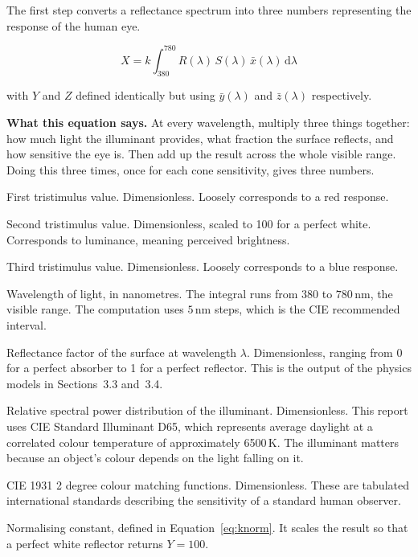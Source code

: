 \documentclass[11pt,a4paper]{article}
\newcommand{\nm}{\ensuremath{\,\mathrm{nm}}}
\newenvironment{symlist}
  {\vspace{-0.2em}\begin{list}{}{%
    \setlength{\leftmargin}{2.4em}\setlength{\labelwidth}{2.0em}%
    \setlength{\labelsep}{0.4em}\setlength{\itemsep}{1pt}%
    \setlength{\parsep}{0pt}\setlength{\topsep}{3pt}%
    \renewcommand{\makelabel}[1]{##1\hfil}}}
  {\end{list}}
\begin{document}
The first step converts a reflectance spectrum into three numbers representing
the response of the human eye.

\begin{equation}
X = k\!\int_{380}^{780} R(\lambda)\,S(\lambda)\,\bar{x}(\lambda)\,\mathrm{d}\lambda
\label{eq:tristim}
\end{equation}

with $Y$ and $Z$ defined identically but using $\bar{y}(\lambda)$ and
$\bar{z}(\lambda)$ respectively.

\noindent\textbf{What this equation says.} At every wavelength, multiply three
things together: how much light the illuminant provides, what fraction the
surface reflects, and how sensitive the eye is. Then add up the result across
the whole visible range. Doing this three times, once for each cone
sensitivity, gives three numbers.

\begin{symlist}
\item[$X$] First tristimulus value. Dimensionless. Loosely corresponds to a red
response.
\item[$Y$] Second tristimulus value. Dimensionless, scaled to 100 for a perfect
white. Corresponds to luminance, meaning perceived brightness.
\item[$Z$] Third tristimulus value. Dimensionless. Loosely corresponds to a
blue response.
\item[$\lambda$] Wavelength of light, in nanometres. The integral runs from 380
to $780\nm$, the visible range. The computation uses $5\nm$ steps, which is the
CIE recommended interval.
\item[$R(\lambda)$] Reflectance factor of the surface at wavelength $\lambda$.
Dimensionless, ranging from 0 for a perfect absorber to 1 for a perfect
reflector. This is the output of the physics models in
Sections~3.3 and~3.4.
\item[$S(\lambda)$] Relative spectral power distribution of the illuminant.
Dimensionless. This report uses CIE Standard Illuminant D65, which represents
average daylight at a correlated colour temperature of approximately 6500\,K.
The illuminant matters because an object's colour depends on the light falling
on it.
\item[$\bar{x},\bar{y},\bar{z}$] CIE 1931 2 degree colour matching functions.
Dimensionless. These are tabulated international standards describing the
sensitivity of a standard human observer.
\item[$k$] Normalising constant, defined in Equation~\eqref{eq:knorm}. It
scales the result so that a perfect white reflector returns $Y = 100$.
\end{symlist}
\end{document}
